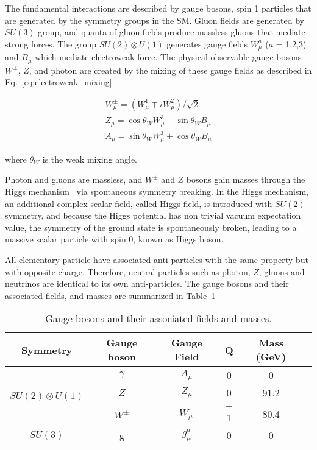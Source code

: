 The fundamental interactions are described by gauge bosons, spin 1 particles that are generated by the symmetry groups in the SM. Gluon fields are generated by $SU(3)$ group, and quanta of gluon fields produce massless gluons that mediate strong forces. The group $SU(2) \otimes U(1)$ generates gauge fields $W^{a}_{\mu}$ ($a$ = 1,2,3) and $B_{\mu}$ which mediate electroweak force. The physical observable gauge bosons $W^{\pm}$, $Z$, and photon are created by the mixing of these gauge fields as described in Eq.~\ref{eq:electroweak_mixing}

\begin{equation}
\label{eq:electroweak_mixing}
\begin{split}
	W^{\pm}_{\mu} = (W^{1}_{\mu} \mp iW^{2}_{\mu}) / \sqrt{2} \\
	Z_{\mu} = \cos \theta_{W} W^{3}_{\mu} - \sin\theta_{W} B_{\mu} \\
	A_{\mu} = \sin \theta_{W} W^{3}_{\mu} + \cos\theta_{W} B_{\mu}
\end{split}
\end{equation}

where $\theta_{W}$ is the weak mixing angle.

Photon and gluons are massless, and $W^{\pm}$ and $Z$ bosons gain masses through the Higgs mechanism~\cite{PhysRevLett.13.508} via spontaneous symmetry breaking. In the Higgs mechanism, an additional complex scalar field, called Higgs field, is introduced with $SU(2)$ symmetry, and because the Higgs potential has non trivial vacuum expectation value, the symmetry of the ground state is spontaneously broken, leading to a massive scalar particle with spin 0, known as Higgs boson.

All elementary particle have associated anti-particles with the same property but with opposite charge. Therefore, neutral particles such as photon, $Z$, gluons and neutrinos are identical to its own anti-particles. The gauge bosons and their associated fields, and masses are summarized in Table~\ref{table:gauge_bosons}

\begin{table}[!htb]
  \centering
  \begin{tabular}{c c c c c c}
    \hline
    \hline
	Symmetry	& Gauge boson	& Gauge Field	& Q & Mass (GeV) \\
	\hline
	\multirow{3}{*}{$SU(2) \otimes U(1)$} & $\gamma$  &	$A_{\mu}$       & 0	   	& 0 	\\
										  & $Z$		  &	$Z_{\mu}$       & 0	   	& 91.2 	\\
										  & $W^{\pm}$ &	$W_{\mu}^{\pm}$ & $\pm$1  & 80.4 	\\
	\hline
	$SU(3)$								  & g		  &	$g^{a}_{\mu}$   &  0		& 0		\\

    \hline
    \hline
  \end{tabular}
  \caption{Gauge bosons and their associated fields and masses.}
  \label{table:gauge_bosons}
\end{table}


